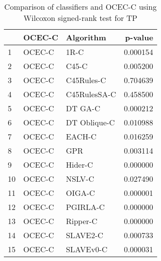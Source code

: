 \begin{table}
\footnotesize
\caption{Comparison of classifiers and OCEC-C using Wilcoxon signed-rank test for TP}
\label{tab:OCEC-C wilcoxon TP comparison}
\begin{tabular}{lllr}
\hline
 & OCEC-C & Algorithm & p-value \\
\hline
1 & OCEC-C & 1R-C & 0.000154 \\
2 & OCEC-C & C45-C & 0.005200 \\
3 & OCEC-C & C45Rules-C & 0.704639 \\
4 & OCEC-C & C45RulesSA-C & 0.458500 \\
5 & OCEC-C & DT GA-C & 0.000212 \\
6 & OCEC-C & DT Oblique-C & 0.010988 \\
7 & OCEC-C & EACH-C & 0.016259 \\
8 & OCEC-C & GPR & 0.003114 \\
9 & OCEC-C & Hider-C & 0.000000 \\
10 & OCEC-C & NSLV-C & 0.027490 \\
11 & OCEC-C & OIGA-C & 0.000001 \\
12 & OCEC-C & PGIRLA-C & 0.000000 \\
13 & OCEC-C & Ripper-C & 0.000000 \\
14 & OCEC-C & SLAVE2-C & 0.000733 \\
15 & OCEC-C & SLAVEv0-C & 0.000031 \\
\hline
\end{tabular}
\end{table}
